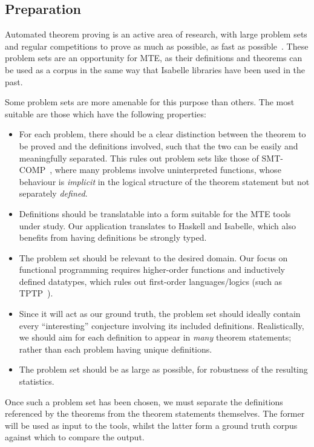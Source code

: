 \subsection{Preparation}
\label{section:prep}

Automated theorem proving is an active area of research, with large problem sets
and regular competitions to prove as much as possible, as fast as
possible~\cite{pelletier2002development}. These problem sets are an opportunity
for MTE, as their definitions and theorems can be used as a corpus in the same
way that Isabelle libraries have been used in the past.

Some problem sets are more amenable for this purpose than others. The most
suitable are those which have the following properties:

\begin{itemize}
\item For each problem, there should be a clear distinction between the theorem
  to be proved and the definitions involved, such that the two can be easily and
  meaningfully separated. This rules out problem sets like those of
  SMT-COMP~\cite{barrett2005smt}, where many problems involve uninterpreted
  functions, whose behaviour is \emph{implicit} in the logical structure of the
  theorem statement but not separately \emph{defined}.
\item Definitions should be translatable into a form suitable for the MTE tools
  under study. Our application translates to Haskell and Isabelle, which also
  benefits from having definitions be strongly typed.
\item The problem set should be relevant to the desired domain. Our focus on
  functional programming requires higher-order functions and inductively defined
  datatypes, which rules out first-order languages/logics (such as
  TPTP~\cite{sutcliffe2009tptp}).
\item Since it will act as our ground truth, the problem set should ideally
  contain every ``interesting'' conjecture involving its included
  definitions. Realistically, we should aim for each definition to appear in
  \emph{many} theorem statements; rather than each problem having unique
  definitions.
\item The problem set should be as large as possible, for robustness of the
  resulting statistics.
\end{itemize}

Once such a problem set has been chosen, we must separate the definitions
referenced by the theorems from the theorem statements themselves. The former
will be used as input to the tools, whilst the latter form a ground truth corpus
against which to compare the output.


